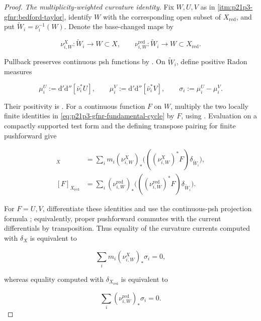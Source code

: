 \begin{proof}
\smallskip
\emph{The multiplicity-weighted curvature identity.}
Fix \(W,U,V\) as in \cref{itm:p21p3-gfnr:bedford-taylor}, identify \(W\)
with the corresponding open subset of \(X_{\mathrm{red}}\), and put
\(\widetilde W_i=\bar\nu_i^{-1}(W)\).  Denote the base-changed maps by

\[
 \nu_{i,W}^{X}:\widetilde W_i\longrightarrow W\subset X,
 \qquad
 \nu_{i,W}^{\mathrm{red}}:\widetilde W_i\longrightarrow
                         W\subset X_{\mathrm{red}}.
\]

Pullback preserves continuous psh functions by
\cite[Proposition~8.1.5]{CLD25}.  On \(\widetilde W_i\), define positive
Radon measures

\[
 \mu_i^U:=\mathrm d'\mathrm d''[\bar\nu_i^*U],
 \qquad
 \mu_i^V:=\mathrm d'\mathrm d''[\bar\nu_i^*V],
 \qquad
 \sigma_i:=\mu_i^U-\mu_i^V.
\]

Their positivity is \cite[Lemma~8.5.5]{CLD25}.  For a continuous function
\(F\) on \(W\), multiply the two locally finite identities in
\eqref{eq:p21p3-gfnr-fundamental-cycle} by \(F\), using
\cite[Example~7.2.12]{CLD25}.  Evaluation on a compactly supported test
form and the defining transpose pairing for finite pushforward give

\begin{align}
 [F]_X
   &=\sum_i m_i(\nu_{i,W}^{X})_*
       \bigl(((\nu_{i,W}^{X})^*F)\delta_{\widetilde W_i}\bigr),
 \label{eq:p21p3-gfnr-function-current-X}\\
 [F]_{X_{\mathrm{red}}}
   &=\sum_i(\nu_{i,W}^{\mathrm{red}})_*
       \bigl(((\nu_{i,W}^{\mathrm{red}})^*F)
                    \delta_{\widetilde W_i}\bigr).
 \label{eq:p21p3-gfnr-function-current-red}
\end{align}

For \(F=U,V\), differentiate these identities and use the continuous-psh
projection formula \cite[Proposition~8.5.6]{CLD25}; equivalently, proper
pushforward commutes with the current differentials by transposition.
Thus equality of the curvature currents computed with \(\delta_X\) is
equivalent to

\begin{equation}
\label{eq:p21p3-gfnr-weighted-measure-sum}
                       \sum_i m_i(\nu_{i,W}^{X})_*\sigma_i=0,
\end{equation}

whereas equality computed with \(\delta_{X_{\mathrm{red}}}\) is
equivalent to

\begin{equation}
\label{eq:p21p3-gfnr-unweighted-measure-sum}
                       \sum_i
                         (\nu_{i,W}^{\mathrm{red}})_*\sigma_i=0.
\end{equation}


\end{proof}
